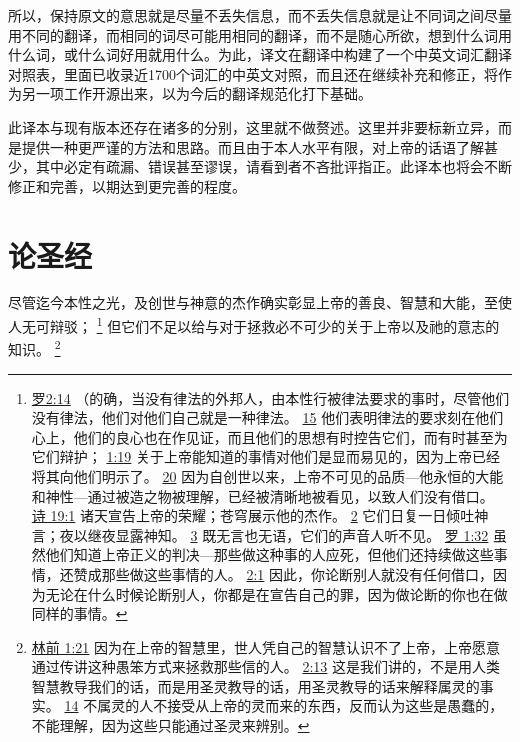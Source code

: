 \documentclass[12pt, a4paper, oneside]{ctexart}
\newcounter{parnum}[section]
\newcommand{\N}{%
   \noindent\refstepcounter{parnum}%
    \makebox[\parindent][l]{\textbf{\arabic{parnum}.}}}
\begin{document}
所以，保持原文的意思就是尽量不丢失信息，而不丢失信息就是让不同词之间尽量用不同的翻译，而相同的词尽可能用相同的翻译，而不是随心所欲，想到什么词用什么词，或什么词好用就用什么。为此，译文在翻译中构建了一个中英文词汇翻译对照表，里面已收录近1700个词汇的中英文对照，而且还在继续补充和修正，将作为另一项工作开源出来，以为今后的翻译规范化打下基础。

此译本与现有版本还存在诸多的分别，这里就不做赘述。这里并非要标新立异，而是提供一种更严谨的方法和思路。而且由于本人水平有限，对上帝的话语了解甚少，其中必定有疏漏、错误甚至谬误，请看到者不吝批评指正。此译本也将会不断修正和完善，以期达到更完善的程度。

\newpage

\section{论圣经}
\N 尽管迄今本性之光，及创世与神意的杰作确实彰显上帝的善良、智慧和大能，至使人无可辩驳；
	\footnote {
		\href{https://biblehub.com/romans/2-14.htm}{罗2:14} （的确，当没有律法的外邦人，由本性行被律法要求的事时，尽管他们没有律法，他们对他们自己就是一种律法。
		\href{https://biblehub.com/romans/2-15.htm}{15} 他们表明律法的要求刻在他们心上，他们的良心也在作见证，而且他们的思想有时控告它们，而有时甚至为它们辩护；
		\href{https://biblehub.com/romans/1-19.htm}{1:19} 关于上帝能知道的事情对他们是显而易见的，因为上帝已经将其向他们明示了。
		\href{https://biblehub.com/romans/1-20.htm}{20} 因为自创世以来，上帝不可见的品质---他永恒的大能和神性---通过被造之物被理解，已经被清晰地被看见，以致人们没有借口。
		\href{https://biblehub.com/psalms/19-1.htm}{诗 19:1} 诸天宣告上帝的荣耀；苍穹展示他的杰作。
		\href{https://biblehub.com/psalms/19-2.htm}{2} 它们日复一日倾吐神言；夜以继夜显露神知。
		\href{https://biblehub.com/psalms/19-3.htm}{3} 既无言也无语，它们的声音人听不见。
		\href{https://biblehub.com/romans/1-32.htm}{罗 1:32} 虽然他们知道上帝正义的判决---那些做这种事的人应死，但他们还持续做这些事情，还赞成那些做这些事情的人。
		\href{https://biblehub.com/romans/2-1.htm}{2:1} 因此，你论断别人就没有任何借口，因为无论在什么时候论断别人，你都是在宣告自己的罪，因为做论断的你也在做同样的事情。
	}
	但它们不足以给与对于拯救必不可少的关于上帝以及祂的意志的知识。
	\footnote {
		\href{https://biblehub.com/1_corinthians/1-21.htm}{林前 1:21} 因为在上帝的智慧里，世人凭自己的智慧认识不了上帝，上帝愿意通过传讲这种愚笨方式来拯救那些信的人。
		\href{https://biblehub.com/1_corinthians/2-13.htm}{2:13} 这是我们讲的，不是用人类智慧教导我们的话，而是用圣灵教导的话，用圣灵教导的话来解释属灵的事实。
		\href{https://biblehub.com/1_corinthians/2-14.htm}{14} 不属灵的人不接受从上帝的灵而来的东西，反而认为这些是愚蠢的，不能理解，因为这些只能通过圣灵来辨别。
	}
\end{document}

